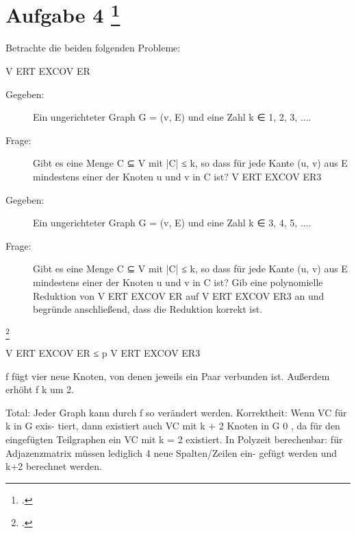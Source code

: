 \documentclass{lehramt-informatik-aufgabe}
\begin{document}
\section{Aufgabe 4
\footcite{46115:2016:09}}

Betrachte die beiden folgenden Probleme:

V ERT EXCOV ER

\begin{description}
\item[Gegeben:]

Ein ungerichteter Graph G = (v, E) und eine Zahl k ∈ {1, 2, 3, ...}.
\item[Frage:]

Gibt es eine Menge C ⊆ V mit |C| ≤ k, so dass für jede Kante (u, v) aus E
mindestens einer der Knoten u und v in C ist?
V ERT EXCOV ER3
\end{description}

\begin{description}
\item[Gegeben:]

Ein ungerichteter Graph G = (v, E) und eine Zahl k ∈ {3, 4, 5, ...}.

\item[Frage:]

Gibt es eine Menge C ⊆ V mit |C| ≤ k, so dass für jede Kante (u, v) aus E
mindestens einer der Knoten u und v in C ist?
Gib eine polynomielle Reduktion von V ERT EXCOV ER auf V ERT EXCOV ER3 an
und begründe anschließend, dass die Reduktion korrekt ist.
\end{description}
\footcite[Seite 12, Aufgabe 13]{theo:ab:4}

\begin{liAntwort}

V ERT EXCOV ER ≤ p V ERT EXCOV ER3

f fügt vier neue Knoten, von denen jeweils ein Paar verbunden ist. Außerdem erhöht f k um 2.

Total: Jeder Graph kann durch f so verändert werden. Korrektheit: Wenn VC für k in G exis-
tiert, dann existiert auch VC mit k + 2 Knoten in G 0 , da für den eingefügten Teilgraphen ein VC
mit k = 2 existiert.
In Polyzeit berechenbar: für Adjazenzmatrix müssen lediglich 4 neue Spalten/Zeilen ein-
gefügt werden und k+2 berechnet werden.

\end{liAntwort}
\end{document}
